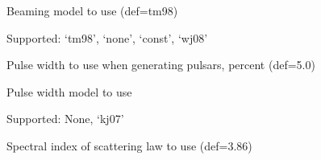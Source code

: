 \documentclass[letterpaper,10pt,english]{sphinxmanual}
\begin{document}
\begin{fulllineitems}
\label{\detokenize{cmd-line-docs:cmdoption-evolve.py-beammodel}}
\pysigstartsignatures
\pysigline
{}
\pysigstopsignatures
\sphinxAtStartPar
Beaming model to use (def=tm98)

\sphinxAtStartPar
Supported: ‘tm98’, ‘none’, ‘const’, ‘wj08’

\end{fulllineitems}


\begin{fulllineitems}
\label{\detokenize{cmd-line-docs:cmdoption-evolve.py-w}}
\pysigstartsignatures
\pysigline
{}
\pysigstopsignatures
\sphinxAtStartPar
Pulse width to use when generating pulsars, percent (def=5.0)

\end{fulllineitems}


\begin{fulllineitems}
\label{\detokenize{cmd-line-docs:cmdoption-evolve.py-wmod}}
\pysigstartsignatures
\pysigline
{}
\pysigstopsignatures
\sphinxAtStartPar
Pulse width model to use

\sphinxAtStartPar
Supported: None, ‘kj07’

\end{fulllineitems}


\begin{fulllineitems}
\label{\detokenize{cmd-line-docs:cmdoption-evolve.py-sc}}
\pysigstartsignatures
\pysigline
{}
\pysigstopsignatures
\sphinxAtStartPar
Spectral index of scattering law to use (def=\sphinxhyphen{}3.86)

\end{fulllineitems}
\end{document}
